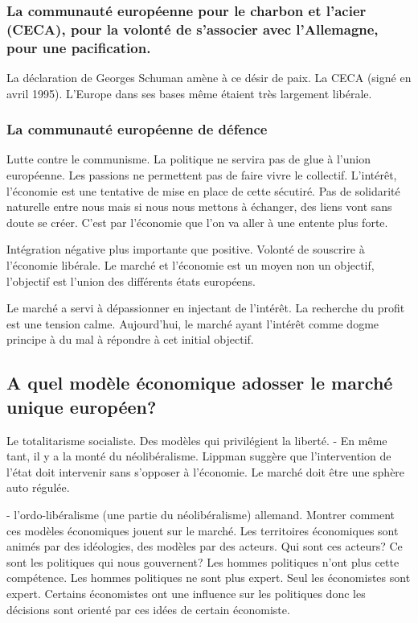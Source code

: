 \subsubsection{La communauté européenne pour le charbon et l'acier (CECA), pour la volonté de s'associer avec l'Allemagne, pour une pacification.}

La déclaration de Georges Schuman amène à ce désir de paix.
La CECA (signé en avril 1995).
L'Europe dans ses bases même étaient très largement libérale. 

\subsubsection{La communauté européenne de défence}

Lutte contre le communisme. La politique ne servira pas de glue à l'union européenne. Les passions ne permettent pas de faire vivre le collectif. L'intérêt, l'économie est une tentative de mise en place de cette sécutiré. Pas de solidarité naturelle entre nous mais si nous nous mettons à échanger, des liens vont sans doute se créer. C'est par l'économie que l'on va aller à une entente plus forte.

Intégration négative plus importante que positive. Volonté de souscrire à l'économie libérale. Le marché et l'économie est un moyen non un objectif, l'objectif est l'union des différents états européens.

Le marché a servi à dépassionner en injectant de l'intérêt. La recherche du profit est une tension calme. Aujourd'hui, le marché ayant l'intérêt comme dogme principe à du mal à répondre à cet initial objectif.


\subsection{A quel modèle économique adosser le marché unique européen?}

Le totalitarisme socialiste. Des modèles qui privilégient la liberté.
- En même tant, il y a la monté du néolibéralisme. Lippman suggère que l'intervention de l'état doit intervenir sans s'opposer à l'économie. Le marché doit être une sphère auto régulée.

- l'ordo-libéralisme (une partie du néolibéralisme) allemand. Montrer comment ces modèles économiques jouent sur le marché. Les territoires économiques sont animés par des idéologies, des modèles par des acteurs. Qui sont ces acteurs? Ce sont les politiques qui nous gouvernent? Les hommes politiques n'ont plus cette compétence. Les hommes politiques ne sont plus expert. Seul les économistes sont expert. Certains économistes ont une influence sur les politiques donc les décisions sont orienté par ces idées de certain économiste.

